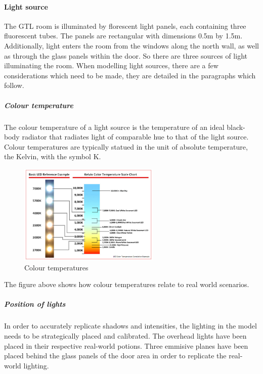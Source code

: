 \documentclass[11pt,a4paper]{report}
\begin{document}
				\paragraph{Light source}
					The GTL room is illuminated by florescent light panels, each containing three fluorescent tubes. The panels are rectangular with dimensions 0.5m by 1.5m. Additionally, light enters the room from the windows along the north wall, as well as through the glass panels within the door. So there are three sources of light illuminating the room. When modelling light sources, there are a few considerations which need to be made, they are detailed in the paragraphs which follow.
					\subparagraph{Colour temperature}
						The colour temperature of a light source is the temperature of an ideal black-body radiator that radiates light of comparable hue to that of the light source. Colour temperatures are typically statued in the unit of absolute temperature, the Kelvin, with the symbol K.
						\begin{figure}[h!]
							\centering
							\includegraphics[width=0.6\textwidth]{colour_temperature}
							\caption{Colour temperatures}
						\end{figure}
						The figure above shows how colour temperatures relate to real world scenarios.
				
					\subparagraph{Position of lights}
						In order to accurately replicate shadows and intensities, the lighting in the model needs to be strategically placed and calibrated. The overhead lights have been placed in their respective real-world potions. Three emmisive planes have been placed behind the glass panels of the door area in order to replicate the real-world lighting.
						
\end{document}
